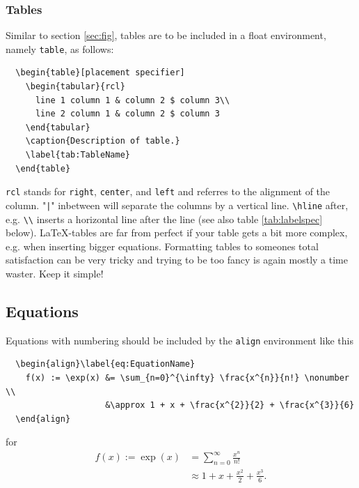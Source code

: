 \documentclass[12pt,a4paper]{article}
\begin{document}
\subsubsection{Tables}
\label{sec:tab}

Similar to section \ref{sec:fig}, tables are to be included in a float
environment, namely \verb!table!, as follows:

\begin{verbatim}
  \begin{table}[placement specifier]
    \begin{tabular}{rcl}
      line 1 column 1 & column 2 $ column 3\\
      line 2 column 1 & column 2 $ column 3
    \end{tabular}
    \caption{Description of table.}
    \label{tab:TableName}
  \end{table}
\end{verbatim}

\verb!rcl! stands for \verb!right!, \verb!center!, and \verb!left! and
referres to the alignment of the column. "\verb!|!" inbetween will separate
the columns by a vertical line. \verb!\hline! after, e.g. \verb!\\! inserts a
horizontal line after the line (see also table \ref{tab:labelspec}
below). \LaTeX-tables are far from perfect if your table gets a bit more
complex, e.g. when inserting bigger equations. Formatting tables to someones
total satisfaction can be very tricky and trying to be too fancy is again
mostly a time waster. Keep it simple!

\subsection{Equations}
\label{sec:eq}

Equations with numbering should be included by the \verb!align! environment
like this
\begin{verbatim}
  \begin{align}\label{eq:EquationName}
    f(x) := \exp(x) &= \sum_{n=0}^{\infty} \frac{x^{n}}{n!} \nonumber \\
                    &\approx 1 + x + \frac{x^{2}}{2} + \frac{x^{3}}{6}
  \end{align}
\end{verbatim}
for
~
\begin{align}\label{eq:EquationName}
  f(x) := \exp(x) &= \sum_{n=0}^{\infty} \frac{x^{n}}{n!} \nonumber \\
                  &\approx 1 + x + \frac{x^{2}}{2} + \frac{x^{3}}{6}.
\end{align}
\end{document}
